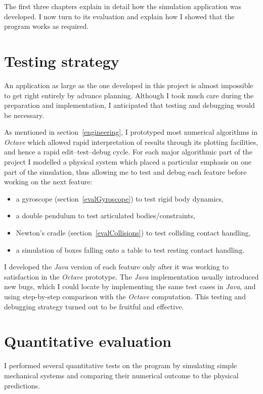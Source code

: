 The first three chapters explain in detail how the simulation application was developed. I now
turn to its evaluation and explain how I showed that the program works as required.

\section{Testing strategy\label{testingStrategy}}

An application as large as the one developed in this project is almost impossible to get right
entirely by advance planning. Although I took much care during the preparation and implementation,
I anticipated that testing and debugging would be necessary.

As mentioned in section~\ref{engineering}, I prototyped most numerical algorithms in
\textsl{Octave} which allowed rapid interpretation of results through its plotting facilities,
and hence a rapid edit--test--debug cycle. For each major algorithmic part of the project
I modelled a physical system which placed a particular emphasis on one part of the simulation,
thus allowing me to test and debug each feature before working on the next feature:
\begin{itemize}
\item a gyroscope (section~\ref{evalGyroscope}) to test rigid body dynamics,
\item a double pendulum to test articulated bodies/constraints,
\item Newton's cradle (section~\ref{evalCollisions}) to test colliding contact handling,
\item a simulation of boxes falling onto a table to test resting contact handling.
\end{itemize}

I developed the \textsl{Java} version of each feature only after it was working to satisfaction in
the \textsl{Octave} prototype. The \textsl{Java} implementation usually introduced new bugs, which
I could locate by implementing the same test cases in \textsl{Java}, and using step-by-step
comparison with the \textsl{Octave} computation. This testing and debugging strategy turned out
to be fruitful and effective.


\section{Quantitative evaluation}

I performed several quantitative tests on the program by simulating simple mechanical systems and
comparing their numerical outcome to the physical predictions.

